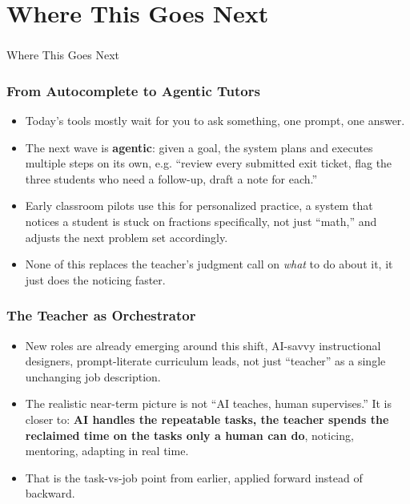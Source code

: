 \section[Next]{Where This Goes Next}

\begin{frame}[fragile]\frametitle{}
\begin{center}
{\Large Where This Goes Next}
\end{center}
\end{frame}

\begin{frame}[fragile]\frametitle{From Autocomplete to Agentic Tutors}
\begin{itemize}
\item Today's tools mostly wait for you to ask something, one prompt, one answer.
\item The next wave is \textbf{agentic}: given a goal, the system plans and executes multiple steps on its own, e.g. ``review every submitted exit ticket, flag the three students who need a follow-up, draft a note for each.''
\item Early classroom pilots use this for personalized practice, a system that notices a student is stuck on fractions specifically, not just ``math,'' and adjusts the next problem set accordingly.
\item None of this replaces the teacher's judgment call on \emph{what} to do about it, it just does the noticing faster.
\end{itemize}
\end{frame}

\begin{frame}[fragile]\frametitle{The Teacher as Orchestrator}
\begin{itemize}
\item New roles are already emerging around this shift, AI-savvy instructional designers, prompt-literate curriculum leads, not just ``teacher'' as a single unchanging job description.
\item The realistic near-term picture is not ``AI teaches, human supervises.'' It is closer to: \textbf{AI handles the repeatable tasks, the teacher spends the reclaimed time on the tasks only a human can do}, noticing, mentoring, adapting in real time.
\item That is the task-vs-job point from earlier, applied forward instead of backward.
\end{itemize}
\end{frame}

